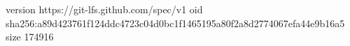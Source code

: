 version https://git-lfs.github.com/spec/v1
oid sha256:a89d423761f124ddc4723c04d0bc1f1465195a80f2a8d2774067efa44e9b16a5
size 174916
